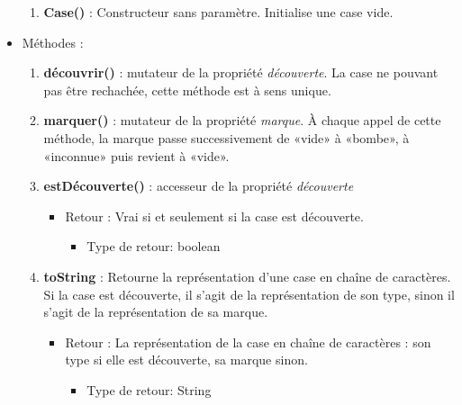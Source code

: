 \begin{itemize}
\begin{enumerate}
  \item {\bf Case() }: Constructeur sans paramètre. Initialise une case vide.
    
  \end{enumerate}

  \item Méthodes : 

    \begin{enumerate}
      
    \item {\bf découvrir() }: mutateur de la propriété {\em découverte}. La case ne pouvant pas être rechachée, cette méthode est à sens unique.

    \item {\bf marquer() }: mutateur de la propriété {\em marque}. À chaque appel de cette méthode, la marque passe successivement de «vide» à «bombe», à «inconnue» puis revient à «vide».
    
    \item {\bf estDécouverte() }: accesseur de la propriété {\em découverte}
      \begin{itemize}
      \item Retour : Vrai si et seulement si la case est découverte.
          \begin{itemize}
          \item Type de retour: boolean
          \end{itemize}
      \end{itemize}
    
    \item {\bf toString }: Retourne la représentation d'une case en chaîne de caractères. Si la case est découverte, il s'agit de la représentation de son type, sinon il s'agit de la représentation de sa marque.
      \begin{itemize}
      \item Retour : La représentation de la case en chaîne de caractères : son type si elle est découverte, sa marque sinon.
          \begin{itemize}
          \item Type de retour: String
          \end{itemize}
      \end{itemize}
    \end{enumerate}
    
  \end{itemize}

